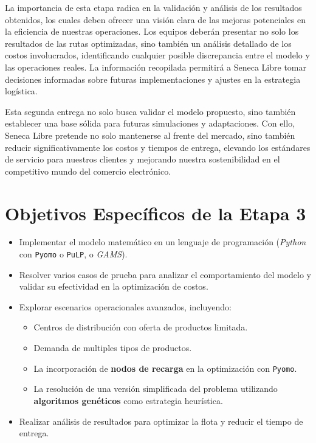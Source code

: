 \documentclass[12pt]{article}
\begin{document}
La importancia de esta etapa radica en la validación y análisis de los resultados obtenidos, los cuales deben ofrecer una visión clara de las mejoras potenciales en la eficiencia de nuestras operaciones. Los equipos deberán presentar no solo los resultados de las rutas optimizadas, sino también un análisis detallado de los costos involucrados, identificando cualquier posible discrepancia entre el modelo y las operaciones reales. La información recopilada permitirá a Seneca Libre tomar decisiones informadas sobre futuras implementaciones y ajustes en la estrategia logística.

Esta segunda entrega no solo busca validar el modelo propuesto, sino también establecer una base sólida para futuras simulaciones y adaptaciones. Con ello, Seneca Libre pretende no solo mantenerse al frente del mercado, sino también reducir significativamente los costos y tiempos de entrega, elevando los estándares de servicio para nuestros clientes y mejorando nuestra sostenibilidad en el competitivo mundo del comercio electrónico.

\section{Objetivos Específicos de la Etapa 3}
\begin{itemize}
    \item Implementar el modelo matemático en un lenguaje de programación (\textit{Python} con \texttt{Pyomo} o \texttt{PuLP}, o \textit{GAMS}).
    \item Resolver varios casos de prueba para analizar el comportamiento del modelo y validar su efectividad en la optimización de costos.
    \item Explorar escenarios operacionales avanzados, incluyendo:
    \begin{itemize}
        \item Centros de distribución con oferta de productos limitada.
        \item Demanda de multiples tipos de productos.
        \item La incorporación de \textbf{nodos de recarga} en la optimización con \texttt{Pyomo}.
        \item La resolución de una versión simplificada del problema utilizando \textbf{algoritmos genéticos} como estrategia heurística.
    \end{itemize}
    \item Realizar análisis de resultados para optimizar la flota y reducir el tiempo de entrega.
\end{itemize}
\end{document}
